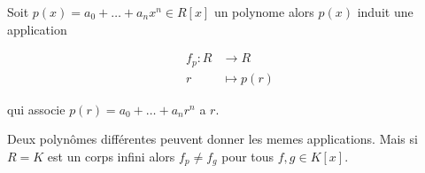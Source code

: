 \begin{definition}[Evaluation]
Soit $p(x)=a_{0}+\dots+a_{n}x^{n}\in R[x]$ un polynome alors $p(x)$ induit une application

\begin{align*}
f_{p}:R & \to R \\
r & \mapsto p(r)
\end{align*}

qui associe $p(r)=a_{0}+\dots+a_{n}r^{n}$ a $r$. 
\end{definition}
\begin{remark}
Deux polynômes différentes peuvent donner les memes applications. Mais si $R=K$ est un corps infini alors $f_{p}\neq f_{g}$ pour tous $f,g\in K[x]$.
\end{remark}

